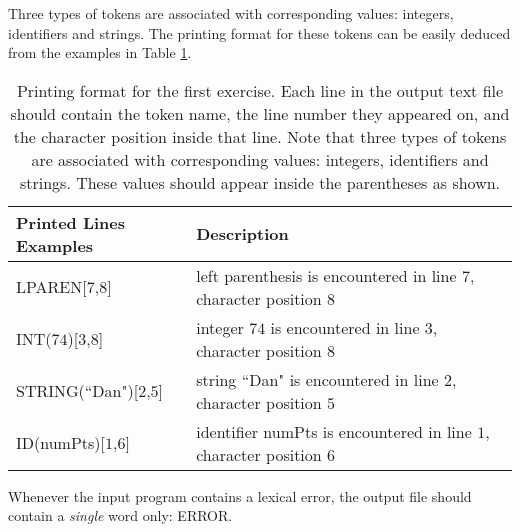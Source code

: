 \documentclass{article}
\begin{document}
Three types of tokens are associated with corresponding values: integers, identifiers and strings.
The printing format for these tokens can be easily deduced from the examples in Table
\ref{Table_Token_Printing_Examples_For_Exercise_1}.
\begin{table}[h]
\centering
\begin{tabular}{|l|l| }
Printed Lines Examples & Description \\
\hline
\hline
LPAREN[$7$,$8$] & left parenthesis is encountered in line $7$, character position $8$ \\
\hline
INT($74$)[$3$,$8$] & integer $74$ is encountered in line $3$, character position $8$ \\
\hline
STRING(``Dan")[$2$,$5$] & string ``Dan" is encountered in line $2$, character position $5$ \\
\hline
ID(numPts)[$1$,$6$] & identifier numPts is encountered in line $1$, character position $6$ \\
\hline
\end{tabular}
\caption{
Printing format for the first exercise.
Each line in the output text file should contain the token name,
the line number they appeared on, and the character position inside that line.
Note that three types of tokens are associated with corresponding values:
integers, identifiers and strings.
These values should appear inside the parentheses as shown.
\label{Table_Token_Printing_Examples_For_Exercise_1}}
\end{table}
Whenever the input program contains a lexical error, the output file
should contain a \textit{single} word only: ERROR.
\end{document}
